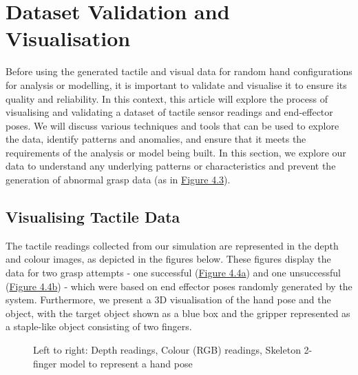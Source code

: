 \documentclass[11pt, a4paper]{report}
\begin{document}
\newpage
\section{Dataset Validation and Visualisation}\label{sec:4.3}
Before using the generated tactile and visual data for random hand configurations for analysis or modelling, it is important to validate and visualise it to ensure its quality and reliability. In this context, this article will explore the process of visualising and validating a dataset of tactile sensor readings and end-effector poses. We will discuss various techniques and tools that can be used to explore the data, identify patterns and anomalies, and ensure that it meets the requirements of the analysis or model being built. In this section, we explore our data to understand any underlying patterns or characteristics and prevent the generation of abnormal grasp data (as in \hyperref[fig:4.3]{Figure 4.3}).


\subsection{Visualising Tactile Data}\label{sec:4.3.1}
The tactile readings collected from our simulation are represented in the depth and colour images, as depicted in the figures below. These figures display the data for two grasp attempts - one successful (\hyperref[fig:4.4a]{Figure 4.4a}) and one unsuccessful (\hyperref[fig:4.4b]{Figure 4.4b}) - which were based on end effector poses randomly generated by the system. Furthermore, we present a 3D visualisation of the hand pose and the object, with the target object shown as a blue box and the gripper represented as a staple-like object consisting of two fingers.
\begin{figure}[H]%
    \centering
    \qquad
    \caption{Left to right: Depth readings, Colour (RGB) readings, Skeleton 2-finger model to represent a hand pose}
    \label{fig:4.4}%
\end{figure}
\end{document}
